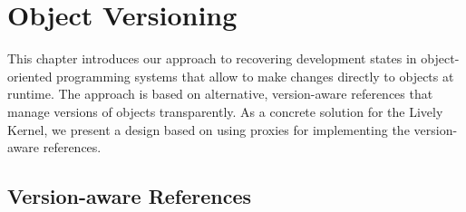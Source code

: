 





\chapter{Object Versioning} \label{chapter:APPROACH}

This chapter introduces our approach to recovering development states in object-oriented programming systems that allow to make changes directly to objects at runtime.
The approach is based on alternative, version-aware references that manage versions of objects transparently.
As a concrete solution for the Lively Kernel, we present a design based on using proxies for implementing the version-aware references.



\section{Version-aware References} \label{sec:APPROACH:1}







